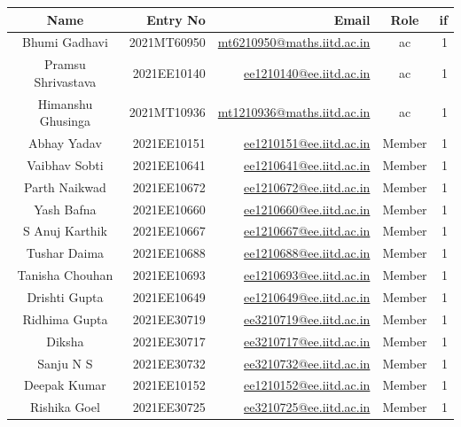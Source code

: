 \documentclass[12pt]{article} %
\begin{document}
\begin{table}[h!]
\centering
\begin{tabular}{|c|r|r|c|r|}
\hline
Name & Entry No & Email & Role & \acrshort{if} \\
\hline
Bhumi Gadhavi & 2021MT60950 & \href{mailto:mt6210950@maths.iitd.ac.in}{mt6210950@maths.iitd.ac.in} & \acrshort{ac} & 1 \\
Pramsu Shrivastava & 2021EE10140 & \href{mailto:ee1210140@ee.iitd.ac.in}{ee1210140@ee.iitd.ac.in} & \acrshort{ac} & 1 \\
Himanshu Ghusinga & 2021MT10936 & \href{mailto:mt1210936@maths.iitd.ac.in}{mt1210936@maths.iitd.ac.in} & \acrshort{ac} & 1\\
Abhay Yadav & 2021EE10151 & \href{mailto:ee1210151@ee.iitd.ac.in}{ee1210151@ee.iitd.ac.in} & Member & 1 \\
Vaibhav Sobti & 2021EE10641 & \href{mailto:ee1210641@ee.iitd.ac.in}{ee1210641@ee.iitd.ac.in} & Member & 1 \\

Parth Naikwad & 2021EE10672 & \href{mailto:ee1210672@ee.iitd.ac.in}{ee1210672@ee.iitd.ac.in} & Member & 1 \\
Yash Bafna & 2021EE10660 & \href{mailto:ee1210660@ee.iitd.ac.in}{ee1210660@ee.iitd.ac.in} & Member & 1 \\
S Anuj Karthik & 2021EE10667 & \href{mailto:ee1210667@ee.iitd.ac.in}{ee1210667@ee.iitd.ac.in} & Member & 1 \\

Tushar Daima & 2021EE10688 & \href{mailto:ee1210688@ee.iitd.ac.in}{ee1210688@ee.iitd.ac.in} & Member & 1 \\
Tanisha Chouhan & 2021EE10693 & \href{mailto:ee1210693@ee.iitd.ac.in}{ee1210693@ee.iitd.ac.in} & Member & 1 \\
Drishti Gupta & 2021EE10649 & \href{mailto:ee1210649@ee.iitd.ac.in}{ee1210649@ee.iitd.ac.in} & Member & 1 \\
Ridhima Gupta & 2021EE30719 & \href{mailto:ee3210719@ee.iitd.ac.in}{ee3210719@ee.iitd.ac.in} & Member & 1 \\
Diksha & 2021EE30717 & \href{mailto:ee3210717@ee.iitd.ac.in}{ee3210717@ee.iitd.ac.in} & Member & 1 \\
Sanju N S & 2021EE30732 & \href{mailto:ee3210732@ee.iitd.ac.in}{ee3210732@ee.iitd.ac.in} & Member & 1 \\
Deepak Kumar & 2021EE10152 & \href{mailto:ee1210152@ee.iitd.ac.in}{ee1210152@ee.iitd.ac.in} & Member & 1 \\
Rishika Goel & 2021EE30725 & \href{mailto:ee32107255@ee.iitd.ac.in}{ee3210725@ee.iitd.ac.in} & Member & 1 \\


\end{tabular}
\end{table}
\end{document}
